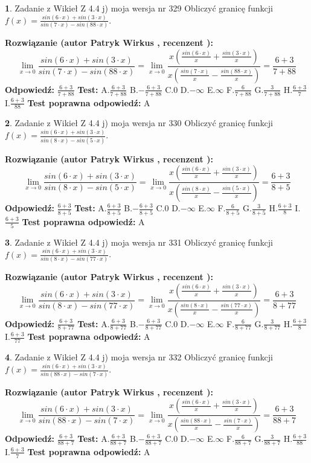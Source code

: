 \documentclass[12pt, a4paper]{article}
\theoremstyle{definition} %
\newtheorem{zad}{}
\newcommand{\zadStart}[1]{\begin{zad}#1\newline}
\newcommand{\zadStop}{\end{zad}}
\newcommand{\rozwStart}[2]{\noindent \textbf{Rozwiązanie (autor #1 , recenzent #2): }\newline}
\newcommand{\rozwStop}{\newline}
\newcommand{\odpStart}{\noindent \textbf{Odpowiedź:}\newline}
\newcommand{\odpStop}{\newline}
\newcommand{\testStart}{\noindent \textbf{Test:}\newline}
\newcommand{\testStop}{\newline}
\newcommand{\kluczStart}{\noindent \textbf{Test poprawna odpowiedź:}\newline}
\newcommand{\kluczStop}{\newline}
\begin{document}
\zadStart{Zadanie z Wikieł Z 4.4 j) moja wersja nr 329}
Obliczyć granicę funkcji $f(x)=\frac{sin(6\cdot x) +sin(3\cdot x)}{sin(7\cdot x) -sin(88\cdot x)}$.
\zadStop
\rozwStart{Patryk Wirkus}{}
$$\lim\limits_{x\to 0}\frac{sin(6\cdot x) +sin(3\cdot x)}{sin(7\cdot x) -sin(88\cdot x)}=\lim\limits_{x\to 0}\frac{x(\frac{sin(6\cdot x)}{x}+\frac{sin(3\cdot x)}{x})}{x(\frac{sin(7\cdot x)}{x}-\frac{sin(88\cdot x)}{x})}=\frac{6+3}{7+88}$$
\rozwStop
\odpStart
$\frac{6+3}{7+88}$
\odpStop
\testStart
A.$\frac{6+3}{7+88}$
B.$-\frac{6+3}{7+88}$
C.$0$
D.$-\infty$
E.$\infty$
F.$\frac{6}{7+88}$
G.$\frac{3}{7+88}$
H.$\frac{6+3}{7}$
I.$\frac{6+3}{88}$
\testStop
\kluczStart
A
\kluczStop



\zadStart{Zadanie z Wikieł Z 4.4 j) moja wersja nr 330}
Obliczyć granicę funkcji $f(x)=\frac{sin(6\cdot x) +sin(3\cdot x)}{sin(8\cdot x) -sin(5\cdot x)}$.
\zadStop
\rozwStart{Patryk Wirkus}{}
$$\lim\limits_{x\to 0}\frac{sin(6\cdot x) +sin(3\cdot x)}{sin(8\cdot x) -sin(5\cdot x)}=\lim\limits_{x\to 0}\frac{x(\frac{sin(6\cdot x)}{x}+\frac{sin(3\cdot x)}{x})}{x(\frac{sin(8\cdot x)}{x}-\frac{sin(5\cdot x)}{x})}=\frac{6+3}{8+5}$$
\rozwStop
\odpStart
$\frac{6+3}{8+5}$
\odpStop
\testStart
A.$\frac{6+3}{8+5}$
B.$-\frac{6+3}{8+5}$
C.$0$
D.$-\infty$
E.$\infty$
F.$\frac{6}{8+5}$
G.$\frac{3}{8+5}$
H.$\frac{6+3}{8}$
I.$\frac{6+3}{5}$
\testStop
\kluczStart
A
\kluczStop



\zadStart{Zadanie z Wikieł Z 4.4 j) moja wersja nr 331}
Obliczyć granicę funkcji $f(x)=\frac{sin(6\cdot x) +sin(3\cdot x)}{sin(8\cdot x) -sin(77\cdot x)}$.
\zadStop
\rozwStart{Patryk Wirkus}{}
$$\lim\limits_{x\to 0}\frac{sin(6\cdot x) +sin(3\cdot x)}{sin(8\cdot x) -sin(77\cdot x)}=\lim\limits_{x\to 0}\frac{x(\frac{sin(6\cdot x)}{x}+\frac{sin(3\cdot x)}{x})}{x(\frac{sin(8\cdot x)}{x}-\frac{sin(77\cdot x)}{x})}=\frac{6+3}{8+77}$$
\rozwStop
\odpStart
$\frac{6+3}{8+77}$
\odpStop
\testStart
A.$\frac{6+3}{8+77}$
B.$-\frac{6+3}{8+77}$
C.$0$
D.$-\infty$
E.$\infty$
F.$\frac{6}{8+77}$
G.$\frac{3}{8+77}$
H.$\frac{6+3}{8}$
I.$\frac{6+3}{77}$
\testStop
\kluczStart
A
\kluczStop



\zadStart{Zadanie z Wikieł Z 4.4 j) moja wersja nr 332}
Obliczyć granicę funkcji $f(x)=\frac{sin(6\cdot x) +sin(3\cdot x)}{sin(88\cdot x) -sin(7\cdot x)}$.
\zadStop
\rozwStart{Patryk Wirkus}{}
$$\lim\limits_{x\to 0}\frac{sin(6\cdot x) +sin(3\cdot x)}{sin(88\cdot x) -sin(7\cdot x)}=\lim\limits_{x\to 0}\frac{x(\frac{sin(6\cdot x)}{x}+\frac{sin(3\cdot x)}{x})}{x(\frac{sin(88\cdot x)}{x}-\frac{sin(7\cdot x)}{x})}=\frac{6+3}{88+7}$$
\rozwStop
\odpStart
$\frac{6+3}{88+7}$
\odpStop
\testStart
A.$\frac{6+3}{88+7}$
B.$-\frac{6+3}{88+7}$
C.$0$
D.$-\infty$
E.$\infty$
F.$\frac{6}{88+7}$
G.$\frac{3}{88+7}$
H.$\frac{6+3}{88}$
I.$\frac{6+3}{7}$
\testStop
\kluczStart
A
\kluczStop
\end{document}
